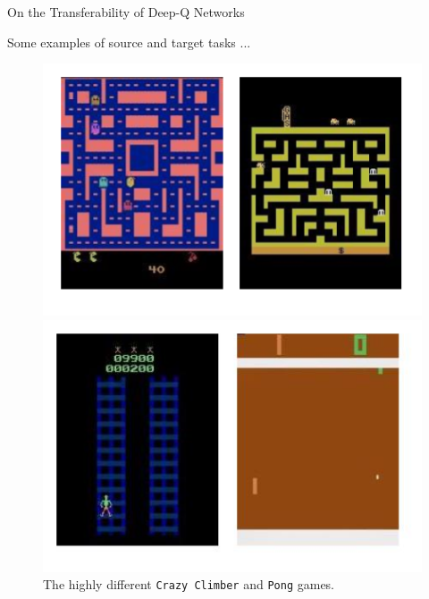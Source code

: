 \documentclass{beamer}
\begin{document}
\begin{frame}{On the Transferability of Deep-Q Networks}

	Some examples of source and target tasks ...

	\begin{figure}[ht]
	\centering
	\begin{minipage}[b]{0.45\linewidth}
	\centering
	\includegraphics[width=\textwidth]{./figures/similar_sources}
	\caption{The visually similar \texttt{Ms Pacman} and \texttt{Bank Heist} games.}
	\label{fig:similar_games}
	\end{minipage}
	\hspace{0.5cm}
	\begin{minipage}[b]{0.45\linewidth}
	\centering
	\includegraphics[width=\textwidth]{./figures/dissimilar_sources}
	\caption{The highly different \texttt{Crazy Climber} and \texttt{Pong} games.}
	\label{fig:dissimilar_games}
	\end{minipage}
	\end{figure}
	\end{frame}
\end{document}
